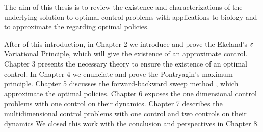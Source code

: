     The aim of this thesis is  to review the existence and characterizations of
    the underlying solution to optimal control problems with applications to
    biology and to approximate the regarding optimal policies. 

    After of this introduction, in Chapter 2 we introduce and prove the Ekeland's
    $\varepsilon$-Variational Principle, which will give the existence of an approximate
    control. Chapter 3 presents the necessary theory to ensure the existence 
    of an optimal control. In Chapter 4 we enunciate and prove the 
    Pontryagin's maximum principle. Chapter 5 discusses the forward-backward sweep 
    method , which approximate the optimal policies. 
    Chapter 6 exposes the one dimensional control problems with one control 
    on their dynamics. 
    Chapter 7 describes the multidimensional control problems with one control and two
    controls on their dynamics 
    We closed this work with the conclusion and perspectives in Chapter 8. 
    
    

\newpage

